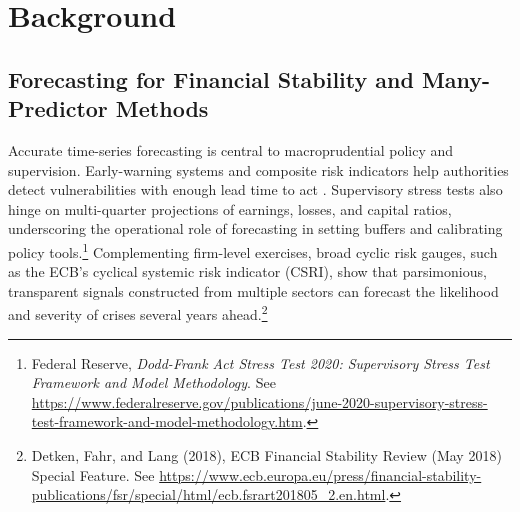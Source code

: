 \documentclass{article}
\begin{document}
\section{Background}
\label{sec:literature}


\subsection{Forecasting for Financial Stability and Many-Predictor Methods}

Accurate time-series forecasting is central to macroprudential policy and supervision. Early-warning systems and composite risk indicators help authorities detect vulnerabilities with enough lead time to act \citep{Oet2011}. Supervisory stress tests also hinge on multi-quarter projections of earnings, losses, and capital ratios, underscoring the operational role of forecasting in setting buffers and calibrating policy tools.\footnote{
    Federal Reserve, \emph{Dodd-Frank Act Stress Test 2020: Supervisory Stress Test Framework and Model Methodology}. See \url{https://www.federalreserve.gov/publications/june-2020-supervisory-stress-test-framework-and-model-methodology.htm}.
} 
Complementing firm-level exercises, broad cyclic risk gauges, such as the ECB's cyclical systemic risk indicator (CSRI), show that parsimonious, transparent signals constructed from multiple sectors can forecast the likelihood and severity of crises several years ahead.\footnote{
    Detken, Fahr, and Lang (2018), ECB Financial Stability Review (May 2018) Special Feature. See \url{https://www.ecb.europa.eu/press/financial-stability-publications/fsr/special/html/ecb.fsrart201805_2.en.html}.
}
\end{document}
